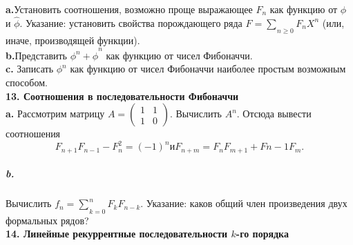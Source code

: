 \noindent\hspace*{15pt}\textbf{a.}Установить соотношения, возможно проще выражающее $F_{n}$ как функцию от $\phi$ и $\hat{\phi}$. Указание: установить свойства порождающего ряда 
$F={\sum_{}^{}}_{n\geq{0}}F_{n}X^{n}$ (или, иначе, производящей функции).\newline
\\
\hspace*{15pt}\textbf {b.}Представить $\phi^{n}+\hat{\phi}^{n}$ как функцию от чисел Фибоначчи. \newline
\\
\hspace*{15pt}\textbf{c.} Записать $\phi^{n}$ как функцию от чисел Фибоначчи наиболее простым возможным способом. \newline
\\
\noindent\textbf{13. Соотношения в последовательности Фибоначчи }\newline
\\
\hspace*{15pt}\textbf{a.} Рассмотрим матрицу $A=\begin{pmatrix}1 & 1 \\ 1 & 0 \end{pmatrix}$. Вычислить $A^{n}$. Отсюда вывести соотношения
\begin{equation*}
F_{n+1}F_{n-1}-F_n^2=\left({-1}\right)^{n} и F_{n+m}=F_{n}F_{m+1}+F{n-1}F_{m}.
\end{equation*}
\subparagraph { b.} Вычислить $f_{n}={\sum_{}^{}}_{k=0}^{n}F_{k}F_{n-k}$. Указание: каков общий член произведения двух формальных рядов?\newline
\\
\noindent\textbf{14. Линейные рекуррентные последовательности $k$-го порядка }\newline

